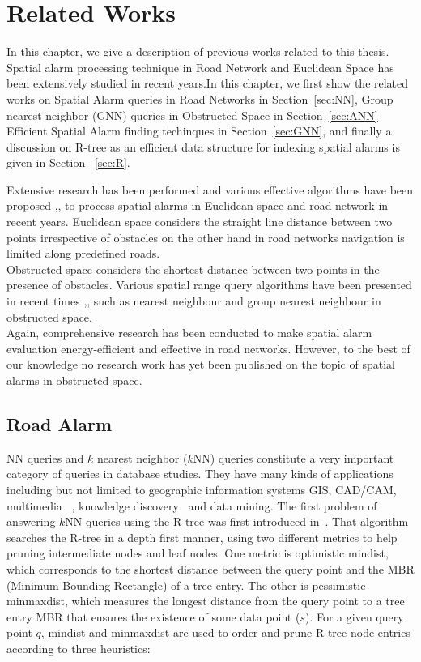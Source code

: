 \chapter{Related Works}
\label{chp:relworks}


In this chapter, we give a description of previous works related to this thesis. Spatial alarm processing technique in Road Network and Euclidean Space has been extensively studied in recent years.In this chapter, we first show the related works on Spatial Alarm queries in Road Networks in Section~\ref{sec:NN}, Group nearest neighbor (GNN) queries in Obstructed Space in Section~\ref{sec:ANN} Efficient Spatial Alarm finding techinques in Section~\ref{sec:GNN}, and finally a discussion on R-tree as an efficient data structure for indexing spatial alarms is given in Section ~\ref{sec:R}.


Extensive research has been performed and various  effective algorithms have been proposed \cite{roadalarm},\cite{mur},\cite{bamba} to process spatial alarms in Euclidean space and road network in recent years. Euclidean space considers the straight line distance between two points irrespective of obstacles on the other hand in road networks navigation is limited along predefined roads.\\ Obstructed space considers the shortest distance between two points in the presence of obstacles. Various spatial range query algorithms have been presented in recent times \cite{obst1},\cite{obst2},\cite{ognn} such as nearest neighbour and group nearest neighbour in obstructed space.\\
Again, comprehensive research \cite{liu} has been conducted to make spatial alarm evaluation energy-efficient and effective in road networks. 
However, to the best of our knowledge no research work has yet been published on the topic of spatial alarms in obstructed space.

\section{\label{sec:NN}Road Alarm}
NN queries  and $k$ nearest neighbor ($k$NN) queries constitute a very important category of queries in database studies. They have many kinds of applications including but not limited to geographic information systems GIS, CAD/CAM, multimedia ~\cite{AP1}, knowledge discovery~\cite{AP2} and data mining. The first problem of answering $k$NN queries using the R-tree was first introduced in~\cite{NN1}. That algorithm searches the R-tree in a depth first manner, using two different metrics to help pruning intermediate nodes and leaf nodes. One metric is optimistic mindist, which corresponds to the shortest distance between the query point and the MBR (Minimum Bounding Rectangle) of a tree entry. The other is pessimistic minmaxdist, which measures the longest distance from the query point to a tree entry MBR that ensures the existence of some data point ($s$). For a given query point $q$, mindist and minmaxdist are used to order and prune R-tree node entries according to three heuristics:


